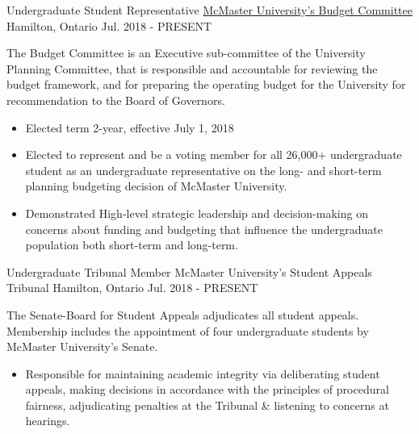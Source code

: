 \begin{cventries}
{\begin{cvitems}
\begin{itemize}
            \end{itemize}
      \end{cvitems}
    }
\vspace{0.25cm}
  \cventry
    {Undergraduate Student Representative} %
    {\href{https://financial-affairs.mcmaster.ca/services/budgeting/budget-committee/2018-19-membership-listing/}{McMaster University's Budget Committee}} %
    {Hamilton, Ontario} %
    {Jul. 2018 - PRESENT} %
     {\renewcommand{\labelitemii}{\bullet}
      \begin{cvitems}%
        \item[] {The Budget Committee is an Executive sub-committee of the University Planning Committee, that is responsible and accountable for reviewing the budget framework, and for preparing the operating budget for the University for recommendation to the Board of Governors.}
            \begin{itemize} 
                \item {Elected term 2-year, effective July 1, 2018}
                \item {Elected to represent and be a voting member for all 26,000+ undergraduate student as an undergraduate representative on the long- and short-term planning budgeting decision of McMaster University.}
                \item {Demonstrated High-level strategic leadership and decision-making on concerns about funding and budgeting that influence the undergraduate population both short-term and long-term.}
            \end{itemize}
      \end{cvitems}
    }


\vspace{0.25cm} 
  \cventry
    {Undergraduate Tribunal Member} %
    {McMaster University's Student Appeals Tribunal} %
    {Hamilton, Ontario} %
    {Jul. 2018 - PRESENT} %
     {\renewcommand{\labelitemii}{\bullet}
      \begin{cvitems}%
        \item[] {The Senate-Board for Student Appeals adjudicates all student appeals. Membership includes the appointment of four undergraduate students by McMaster University's Senate.}
            \begin{itemize} 
                \item {Responsible for maintaining academic integrity via deliberating student appeals, making decisions in accordance with the principles of procedural fairness, adjudicating penalties at the Tribunal \& listening to concerns at hearings.}
            \end{itemize}
      \end{cvitems}
    }
    

\end{cventries}
